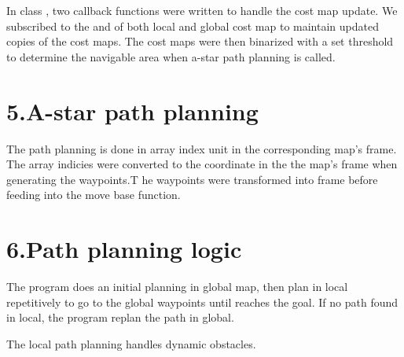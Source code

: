 \documentclass{article}
\begin{document}
\noindent{}In class , two callback functions were written to handle the cost map update. We subscribed to the  and  of both local and global cost map to maintain updated copies of the cost maps. The cost maps were then binarized with a set threshold to determine the navigable area when a-star path planning is called.%

\section{5.\hspace*{0.5em}A-star path planning}\label{sec-a-star-path-planning}%

\noindent{}The path planning is done in array index unit in the corresponding map's frame. The array indicies were converted to the coordinate in the the map's frame when generating the waypoints.T he waypoints were transformed into  frame before feeding into the move base function.  %

\section{6.\hspace*{0.5em}Path planning logic}\label{sec-path-planning-logic}%

\noindent{}The program does an initial planning in global map, then plan in local repetitively to go to the global waypoints until reaches the goal. If no path found in local, the program replan the path in global.%

The local path planning handles dynamic obstacles.%
\end{document}
